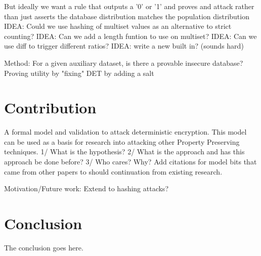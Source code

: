 \documentclass[journal]{IEEEtran}
\begin{document}


But ideally we want a rule that outputs a '0' or '1' and proves and attack rather than just asserts the database distribution matches the population distribution
IDEA: Could we use hashing of multiset values as an alternative to strict counting?
IDEA: Can we add a length funtion to use on multiset?
IDEA: Can we use diff to trigger different ratios?
IDEA: write a new built in? (sounds hard)

Method: For a given auxiliary dataset, is there a provable insecure database?  
Proving utility by "fixing" DET by adding a salt

\section{Contribution}

A formal model and validation to attack deterministic encryption. This model can be used as a basis for research into attacking other Property Preserving techniques.
1/ What is the hypothesis?
2/ What is the approach and has this approach be done before?
3/ Who cares? Why?
		Add citations for model bits that came from other papers to should continuation from existing research. 


Motivation/Future work: Extend to hashing attacks?

\section{Conclusion}
The conclusion goes here.
\end{document}
